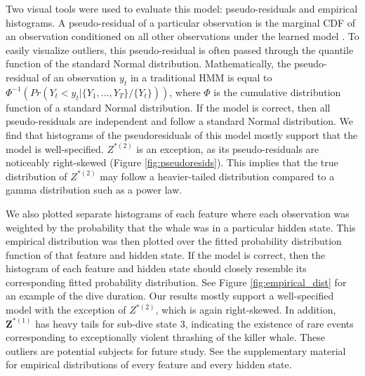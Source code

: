 Two visual tools were used to evaluate this model: pseudo-residuals and empirical histograms. A pseudo-residual of a particular observation is the marginal CDF of an observation conditioned on all other observations under the learned model \citep{Zucchini:2016}. To easily visualize outliers, this pseudo-residual is often passed through the quantile function of the standard Normal distribution. Mathematically, the pseudo-residual of an observation $y_t$ in a traditional HMM is equal to $\Phi^{-1} \left(Pr(Y_t < y_t|\{Y_1,\ldots,Y_T\}/\{Y_t\}) \right)$, where $\Phi$ is the cumulative distribution function of a standard Normal distribution. If the model is correct, then all pseudo-residuals are independent and follow a standard Normal distribution. We find that histograms of the pseudoresiduals of this model mostly support that the model is well-specified. $Z^{*(2)}$ is an exception, as its pseudo-residuals are noticeably right-skewed (Figure \ref{fig:pseudoresids}). This implies that the true distribution of $Z^{*(2)}$ may follow a heavier-tailed distribution compared to a gamma distribution such as a power law. 

We also plotted separate histograms of each feature where each observation was weighted by the probability that the whale was in a particular hidden state. This empirical distribution was then plotted over the fitted probability distribution function of that feature and hidden state. If the model is correct, then the histogram of each feature and hidden state should closely resemble its corresponding fitted probability distribution. See Figure \ref{fig:empirical_dist} for an example of the dive duration. Our results mostly support a well-specified model with the exception of $Z^{*(2)}$, which is again right-skewed. In addition, $\mathbf{Z}^{*(1)}$ has heavy tails for sub-dive state 3, indicating the existence of rare events corresponding to exceptionally violent thrashing of the killer whale. These outliers are potential subjects for future study. See the supplementary material for empirical distributions of every feature and every hidden state. 